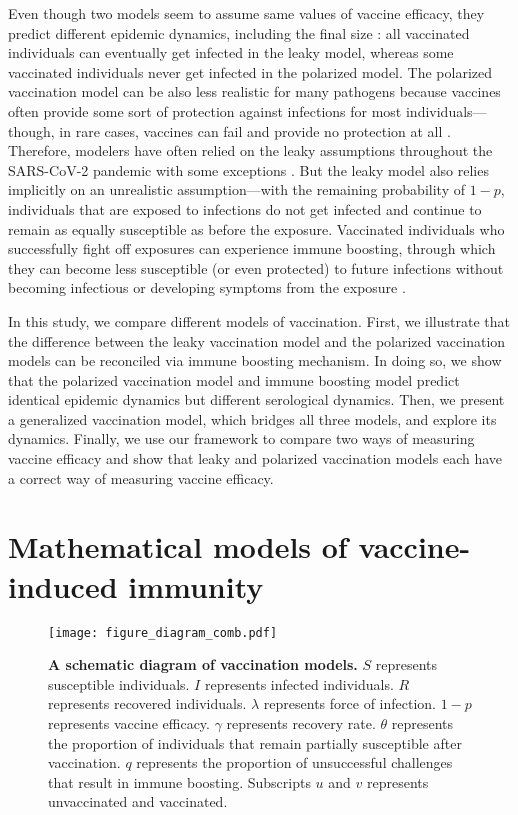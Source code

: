 \documentclass[12pt]{article}
\begin{document}
Even though two models seem to assume same values of vaccine efficacy, they predict different epidemic dynamics, including the final size \citep{smith1984assessment}:
all vaccinated individuals can eventually get infected in the leaky model, whereas some vaccinated individuals never get infected in the polarized model.
The polarized vaccination model can be also less realistic for many pathogens because vaccines often provide some sort of protection against infections for most individuals---though, in rare cases, vaccines can fail and provide no protection at all \citep{wiedermann2016primary}.
Therefore, modelers have often relied on the leaky assumptions throughout the SARS-CoV-2 pandemic \citep{dyson2021possible,gozzi2021importance,marziano2021vaccine,matrajt2021vaccine,park2022intermediate} with some exceptions \citep{bubar2021model,buckner2021dynamic}.
But the leaky model also relies implicitly on an unrealistic assumption---with the remaining probability of $1-p$, individuals that are exposed to infections do not get infected and continue to remain as equally susceptible as before the exposure.
Vaccinated individuals who successfully fight off exposures can experience immune boosting, through which they can become less susceptible (or even protected) to future infections without becoming infectious or developing symptoms from the exposure \citep{lavine2011natural,yang2020waning}.

In this study, we compare different models of vaccination.
First, we illustrate that the difference between the leaky vaccination model and the polarized vaccination models can be reconciled via immune boosting mechanism.
In doing so, we show that the polarized vaccination model and immune boosting model predict identical epidemic dynamics but different serological dynamics.
Then, we present a generalized vaccination model, which bridges all three models, and explore its dynamics.
Finally, we use our framework to compare two ways of measuring vaccine efficacy and show that leaky and polarized vaccination models each have a correct way of measuring vaccine efficacy.

\section*{Mathematical models of vaccine-induced immunity}

\begin{figure}[!th]
\texttt{[image: figure\_diagram\_comb.pdf]}
\caption{
\textbf{A schematic diagram of vaccination models.}
$S$ represents susceptible individuals. $I$ represents infected individuals. $R$ represents recovered individuals.
$\lambda$ represents force of infection. 
$1-p$ represents vaccine efficacy.
$\gamma$ represents recovery rate.
$\theta$ represents the proportion of individuals that remain partially susceptible after vaccination.
$q$ represents the proportion of unsuccessful challenges that result in immune boosting.
Subscripts $u$ and $v$ represents unvaccinated and vaccinated.
\label{fig:diagram}
}
\end{figure}
\end{document}
